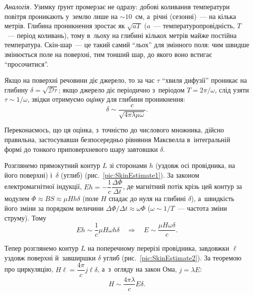 \emph{Аналогія.} Узимку ґрунт промерзає не одразу: добові коливання температури повітря проникають у~землю лише на ${\sim}10$~см, а~річні (сезонні)~--- на кілька метрів. Глибина проникнення зростає як $\sqrt{aT}$ ($a$~--- температуропровідність, $T$~--- період коливань), тому в~льоху на глибині кількох метрів майже постійна температура. Скін-шар~--- це такий самий \enquote{льох} для змінного поля: чим швидше змінюється поле на поверхні, тим тонший шар, до якого воно встигає \enquote{просочитися}.

Якщо на поверхні речовини діє джерело, то за час $\tau$
\enquote{хвиля дифузії} проникає на глибину $\delta=\sqrt{\mathcal{D}\tau}$; якщо джерело діє
періодично з~періодом $T=2\pi/\omega$, слід узяти $\tau\sim1/\omega$, звідки отримуємо \emph{оцінку} для глибини
проникнення:
\begin{equation}\label{eq:SkinDepthEstimate}
	\delta \sim \frac{c}{\sqrt{4\pi\lambda\mu\omega}}.
\end{equation}

Переконаємось, що ця оцінка, з~точністю до числового множника, дійсно правильна,
застосувавши безпосередньо рівняння Максвелла в~інтегральній формі до тонкого
приповерхневого шару завтовшки $\delta$.

 Розглянемо прямокутний контур $L$ зі сторонами $h$ (уздовж
осі провідника, на його поверхні) і~$\delta$ (углиб) (рис.~\ref{pic:SkinEstimate1}). За
законом електромагнітної індукції, $Eh = -\dfrac1c\dfrac{\Delta\Phi}{\Delta t}$, де
магнітний потік крізь цей контур за модулем $\Phi\approx BS\approx\mu H h\delta$ (поле $H$ спадає до нуля на
глибині $\delta$), а~швидкість його зміни за порядком величини $\Delta\Phi/\Delta t
\approx \omega\Phi$ ($\omega\sim1/T$~--- частота зміни струму). Тому
\begin{equation}\label{eq:SkinCirculationE}
	Eh \sim \frac1c\mu H\omega h\delta \quad\Rightarrow\quad E \sim \frac{\mu H\omega\delta}{c}.
\end{equation}

 Тепер розглянемо контур $L$ на поперечному перерізі
провідника, завдовжки $\ell$ уздовж поверхні й~завширшки $\delta$ углиб
(рис.~\ref{pic:SkinEstimate2}). За теоремою про циркуляцію, $H\ell =
\dfrac{4\pi}{c}j\ell\delta$, а~з~огляду на закон Ома, $j=\lambda E$:
\begin{equation}\label{eq:SkinCirculationH}
	H \sim \frac{4\pi\lambda}{c}E\delta.
\end{equation}

